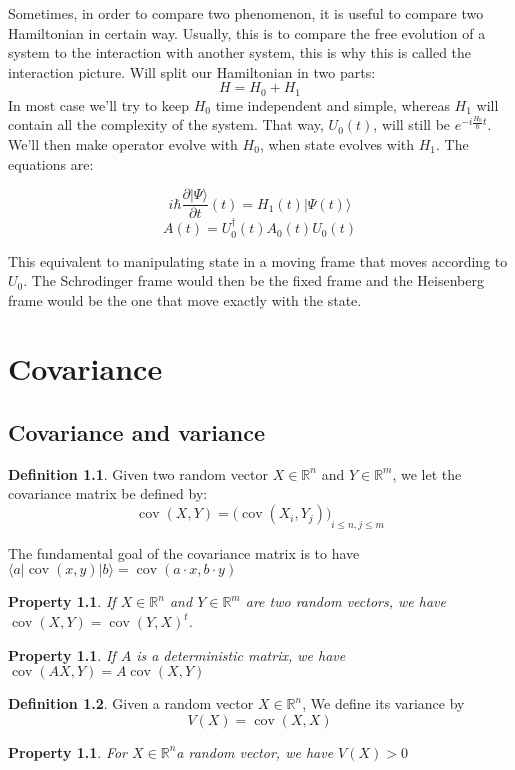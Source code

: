 \documentclass[10pt]{report}
\theoremstyle{plain}
\newtheorem{prop}[thm]{Property}
\theoremstyle{definition}
\newtheorem{defn}{Definition}[chapter]
\theoremstyle{remark}
\newcommand{\R}{\ensuremath{\mathbb{R}}}
\newcommand{\ket}[1]{|#1\rangle}
\newcommand{\bra}[1]{\langle#1|}
\renewcommand{\leq}{\leqslant}
\DeclareMathOperator{\cov}{cov}
\begin{document}
Sometimes, in order to compare two phenomenon, it is useful to compare two
Hamiltonian in certain way. Usually, this is to compare the free evolution of a
system to the interaction with another system, this is why this is called the
interaction picture. Will split our Hamiltonian in two parts:
\[H = H_0 + H_1\]
In most case we'll try to keep $H_0$ time independent and simple, whereas $H_1$
will contain all the complexity of the system. That way, $U_0(t)$, will still be
$e^{-i\frac {H_0}\hbar t}$. We'll then make operator evolve with $H_0$, when
state evolves with $H_1$. The equations are:

\[i\hbar \frac{\partial \ket \Psi}{\partial t} (t) = H_1(t) \ket {\Psi(t)} \]
\[A(t) = U_0^\dagger(t)A_0(t)U_0(t)\]

This equivalent to manipulating state in a moving frame that moves according to
$U_0$. The Schrodinger frame would then be the fixed frame and the Heisenberg frame
would be the one that move exactly with the state.

\chapter{Covariance}\label{app:cov}

\section{Covariance and variance}

\begin{defn}
  Given two random vector $X \in \R^n$ and $Y \in \R^m$, we let the covariance
  matrix be defined by:
  \[\cov(X,Y) = {\big(\cov(X_i,Y_j)\big)}_{i \leq n, j \leq m}\]
\end{defn}

The fundamental goal of the covariance matrix is to have $\bra a \cov(x,y) \ket
b = \cov(a \cdot x, b \cdot y)$
\begin{prop} If $X \in \R^n$ and $Y \in \R^m$ are two random vectors, we have $\cov(X,Y) = {\cov(Y,X)}^t$.
\end{prop}
\begin{prop} If $A$ is a deterministic matrix, we have $ \cov(A X, Y) = A \cov(X,Y)$
\end{prop}

\begin{defn}
  Given a random vector $X \in \R^n$, We define its variance by
  \[V(X) = \cov(X,X)\]
\end{defn}

\begin{prop} For $X \in \R^n$a random vector, we have $V(X) > 0$
\end{prop}
\end{document}
